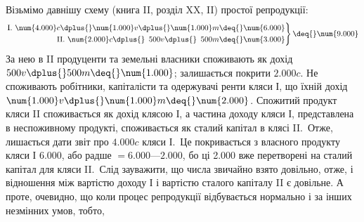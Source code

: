 Візьмімо давнішу схему (книга II, розділ XX, II) простої репродукції:
\[
 \left.\begin{aligned}
        \text{I. }\num{4.000} c \dplus{} \num{1.000} v \dplus{} \num{1.000} m \deq{} \num{6.000}\\
        \text{II. }\num{2.000} c \dplus{} \phantom{1}500 v \dplus{} \phantom{1}500 m \deq{} \num{3.000}
       \end{aligned}
 \right\}
  \deq{} \num{9.000}
\]
За нею в II продуценти та земельні власники споживають як дохід
$500 v \dplus{} 500 m \deq{} \num{1.000}$; залишається покрити $\num{2.000} c$. Не споживають
робітники, капіталісти та одержувачі ренти кляси І, що їхній дохід \deq{}
$\num{1.000} v \dplus{} \num{1.000} m \deq{} \num{2.000}$. Спожитий продукт кляси II споживається як дохід
клясою І, а частина доходу кляси І, представлена в неспоживному продукті,
споживається як сталий капітал в клясі II.~Отже, лишається дати звіт про
$\num{4.000} c$ кляси І.~Це покривається з власного продукту кляси І \deq{} \num{6.000}, або радше
$= \num{6.000} — \num{2.000}$, бо ці \num{2.000} вже перетворені на сталий капітал для кляси II.~Слід
зауважити, що числа звичайно взято довільно, отже, і відношення між вартістю
доходу І і вартістю сталого капіталу II є довільне. А проте, очевидно, що коли
процес репродукції відбувається нормально і за інших незмінних умов, тобто,
\parbreak{}  %
